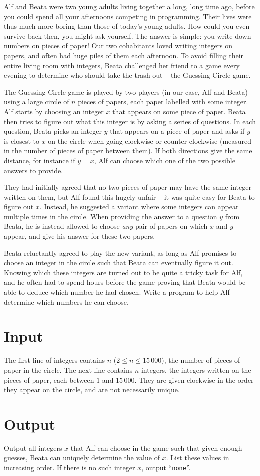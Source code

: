 Alf and Beata were two young adults living together a long, long time ago, before you could spend all your afternoons competing in programming.
Their lives were thus much more boring than those of today's young adults.
How could you even survive back then, you might ask yourself.
The answer is simple: you write down numbers on pieces of paper!
Our two cohabitants loved writing integers on papers, and often had huge piles of them each afternoon.
To avoid filling their entire living room with integers, Beata challenged her friend to a game every evening to determine who should take the trash out -- the Guessing Circle game.

The Guessing Circle game is played by two players (in our case, Alf and Beata) using a large circle of $n$ pieces of papers, each paper labelled with some integer.
Alf starts by choosing an integer $x$ that appears on some piece of paper.
Beata then tries to figure out what this integer is by asking a series of questions.
In each question, Beata picks an integer $y$ that appears on a piece of paper and asks if $y$ is closest to $x$ on the circle when going clockwise or counter-clockwise (measured in the number of pieces of paper between them).
If both directions give the same distance, for instance if $y = x$, Alf can choose which one of the two possible answers to provide.

They had initially agreed that no two pieces of paper may have the same integer written on them, but Alf found this hugely unfair -- it was quite easy for Beata to figure out $x$.
Instead, he suggested a variant where some integers can appear multiple times in the circle.
When providing the answer to a question $y$ from Beata, he is instead allowed to choose \emph{any} pair of papers on which $x$ and $y$ appear, and give his answer for these two papers.

Beata reluctantly agreed to play the new variant, as long as Alf promises to choose an integer in the circle such that Beata can eventually figure it out.
Knowing which these integers are turned out to be quite a tricky task for Alf, and he often had to spend hours before the game proving that Beata would be able to deduce which number he had chosen.
Write a program to help Alf determine which numbers he can choose.

\section*{Input}

The first line of integers contains $n$ ($2 \le n \le 15\,000$), the number of pieces of paper in the circle.
The next line contains $n$ integers, the integers written on the pieces of paper, each between $1$ and $15\,000$.
They are given clockwise in the order they appear on the circle, and are not necessarily unique.

\section*{Output}
Output all integers $x$ that Alf can choose in the game such that given enough guesses, Beata can uniquely determine the value of $x$.  List these values in increasing order.
If there is no such integer $x$, output ``\texttt{none}''.
